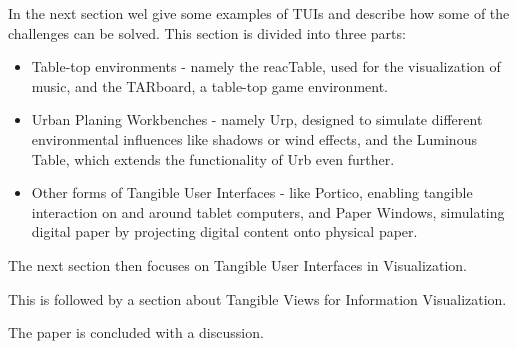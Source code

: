 In the next section wel give some examples of TUIs and describe how some of the challenges can be solved. 
This section is divided into three parts: 
\begin{itemize}
\item Table-top environments - namely the reacTable, used for the visualization of music, and the TARboard, a table-top game environment.
\item Urban Planing Workbenches - namely Urp, designed to simulate different environmental influences like shadows or wind effects, and the Luminous Table, which extends the functionality of Urb even further.
\item Other forms of Tangible User Interfaces - like Portico, enabling tangible interaction on and around tablet computers, and Paper Windows, simulating digital paper by projecting digital content onto physical paper.
\end{itemize}

The next section then focuses on Tangible User Interfaces in Visualization.

This is followed by a section about Tangible Views for Information Visualization.

The paper is concluded with a discussion.
